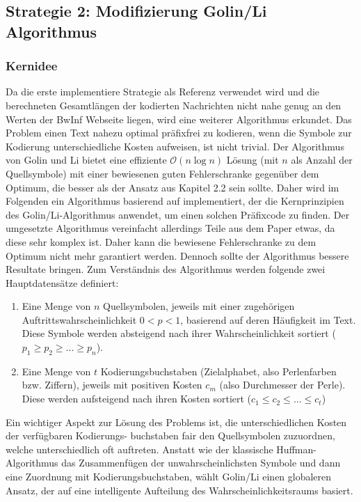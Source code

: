 \documentclass[a4paper,10pt,ngerman]{scrartcl}
\begin{document}
\subsection{Strategie 2: Modifizierung Golin/Li Algorithmus}
\subsubsection{Kernidee}
Da die erste implementiere Strategie als Referenz verwendet wird und die berechneten Gesamtlängen der kodierten Nachrichten nicht nahe genug an den Werten der BwInf Webseite liegen, wird eine weiterer Algorithmus erkundet. Das Problem einen Text nahezu optimal präfixfrei zu kodieren, wenn die Symbole zur Kodierung unterschiedliche Kosten aufweisen, ist nicht trivial. Der Algorithmus von Golin und Li \cite{papergolinli} bietet eine effiziente $\mathcal{O}(n \log n)$ Lösung (mit $n$ als Anzahl der Quellsymbole) mit einer bewiesenen guten Fehlerschranke gegenüber dem Optimum, die besser als der Ansatz aus Kapitel 2.2 sein sollte. Daher wird im Folgenden ein Algorithmus basierend auf \cite[Fig 6. und Kapitel 4]{papergolinli} implementiert, der die Kernprinzipien des Golin/Li-Algorithmus anwendet, um einen solchen Präfixcode zu finden. Der umgesetzte Algorithmus vereinfacht allerdings Teile aus dem Paper etwas, da diese sehr komplex ist. Daher kann die bewiesene Fehlerschranke zu dem Optimum nicht mehr garantiert werden. Dennoch sollte der Algorithmus bessere Resultate bringen. 
\newline
Zum Verständnis des Algorithmus werden folgende zwei Hauptdatensätze definiert:
\begin{enumerate}
  \item Eine Menge von $n$ Quellsymbolen, jeweils mit einer zugehörigen Auftrittswahrscheinlichkeit $0 < p < 1$, basierend auf deren Häufigkeit im Text. Diese Symbole werden absteigend nach ihrer Wahrscheinlichkeit sortiert ($p_{1} \ge p_{2} \ge ... \ge p_{n}$). 
  \item Eine Menge von $t$ Kodierungsbuchstaben (Zielalphabet, also Perlenfarben bzw. Ziffern), jeweils mit positiven Kosten $c_{m}$ (also Durchmesser der Perle). Diese werden aufsteigend nach ihren Kosten sortiert ($c_{1} \le c_{2} \le ... \le c_{t}$)
\end{enumerate}
Ein wichtiger Aspekt zur Lösung des Problems ist, die unterschiedlichen Kosten der verfügbaren Kodierungs- buchstaben fair den Quellsymbolen zuzuordnen, welche unterschiedlich oft auftreten. Anstatt wie der klassische Huffman-Algorithmus das Zusammenfügen der unwahrscheinlichsten Symbole und dann eine Zuordnung mit Kodierungsbuchstaben, wählt Golin/Li einen globaleren Ansatz, der auf eine intelligente Aufteilung des Wahrscheinlichkeitsraums basiert. 
\end{document}
